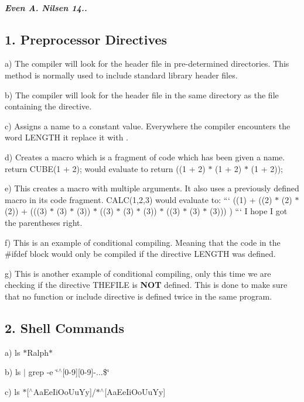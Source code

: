 \subparagraph*{Even A. Nilsen 14..}

\subsection*{1. Preprocessor Directives}

a) The compiler will look for the header file in pre-\/determined directories. This method is normally used to include standard library header files.

b) The compiler will look for the header file in the same directory as the file containing the directive.

c) Assigns a name to a constant value. Everywhere the compiler encounters the word {\ttfamily L\+E\+N\+G\+T\+H} it replace it with {}.

d) Creates a macro which is a fragment of code which has been given a name. {\ttfamily return C\+U\+B\+E(1 + 2);} would evaluate to {\ttfamily return ((1 + 2) $\ast$ (1 + 2) $\ast$ (1 + 2));}

e) This creates a macro with multiple arguments. It also uses a previously defined macro in its code fragment. {\ttfamily C\+A\+L\+C(1,2,3)} would evaluate to\+: ``` ((1) + ((2) $\ast$ (2) $\ast$ (2)) + (((3) $\ast$ (3) $\ast$ (3)) $\ast$ ((3) $\ast$ (3) $\ast$ (3)) $\ast$ ((3) $\ast$ (3) $\ast$ (3))) ) ``` I hope I got the parentheses right.

f) This is an example of conditional compiling. Meaning that the code in the {\ttfamily \#ifdef} block would only be compiled if the directive {\ttfamily L\+E\+N\+G\+T\+H} was defined.

g) This is another example of conditional compiling, only this time we are checking if the directive {\ttfamily T\+H\+E\+F\+I\+L\+E} is {\bfseries N\+O\+T} defined. This is done to make sure that no function or include directive is defined twice in the same program.

\subsection*{2. Shell Commands}

a) {\ttfamily ls $\ast$\+Ralph$\ast$}

b) {\ttfamily ls $\vert$ grep -\/e \char`\"{}$^\wedge$\mbox{[}0-\/9\mbox{]}\mbox{[}0-\/9\mbox{]}-\/...\$\char`\"{}}

c) {\ttfamily ls $\ast$\mbox{[}$^\wedge$\+Aa\+Ee\+Ii\+Oo\+Uu\+Yy\mbox{]}/$\ast$$^\wedge$\mbox{[}Aa\+Ee\+Ii\+Oo\+Uu\+Yy\mbox{]}}

